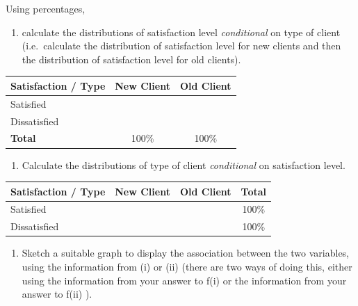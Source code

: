 \documentclass[
  11pt,
  oneside]{scrbook}
\providecommand{\tightlist}{%
  \setlength{\itemsep}{0pt}\setlength{\parskip}{0pt}}
\begin{document}
Using percentages,

\begin{enumerate}
\def\labelenumi{\roman{enumi}.}
\tightlist
\item
  calculate the distributions of satisfaction level \emph{conditional} on type of client (i.e.~calculate the distribution of satisfaction level for new clients and then the distribution of satisfaction level for old clients).
\end{enumerate}

\begin{table}[H]
\centering
\renewcommand{\arraystretch}{3} %

\begin{tabular}{|l|c|c|}
\hline
\textbf{Satisfaction / Type} & \textbf{New Client} & \textbf{Old Client} \\
\hline
Satisfied 
  &  
  &   \\
\hline
Dissatisfied 
  &  
  &   \\
\hline
\textbf{Total} 
  & 100\% 
  & 100\% \\
\hline
\end{tabular}
\end{table}

\begin{enumerate}
\def\labelenumi{\roman{enumi}.}
\setcounter{enumi}{1}
\tightlist
\item
  Calculate the distributions of type of client \emph{conditional} on satisfaction level.
\end{enumerate}

\begin{table}[H]
\centering
\renewcommand{\arraystretch}{3} %

\begin{tabular}{|l|c|c|c|}
\hline
\textbf{Satisfaction / Type} & \textbf{New Client} & \textbf{Old Client} & \textbf{Total} \\
\hline
Satisfied 
  &  
  &  
  & 100\% \\
\hline
Dissatisfied 
  &  
  &  
  & 100\% \\
\hline
\end{tabular}
\end{table}

\begin{enumerate}
\def\labelenumi{\roman{enumi}.}
\setcounter{enumi}{2}
\tightlist
\item
  Sketch a suitable graph to display the association between the two variables,
  using the information from (i) or (ii) (there are two ways of doing
  this, either using the information from your answer to f(i) or the information
  from your answer to f(ii) ).
\end{enumerate}
\end{document}
